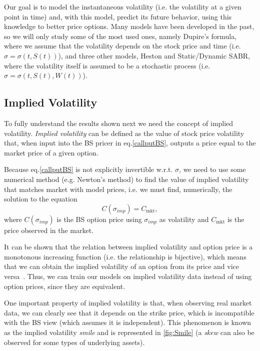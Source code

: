 Our goal is to model the instantaneous volatility (i.e. the volatility at a given point in time) and, with this model, predict its future behavior, using this knowledge to better price options.
Many models have been developed in the past, so we will only study some of the most used ones, namely Dupire's formula, where we assume that the volatility depends on the stock price and time (i.e. $\sigma=\sigma(t,S(t))$), and three other models, Heston and Static/Dynamic SABR, where the volatility itself is assumed to be a stochastic process (i.e. $\sigma=\sigma(t,S(t),W(t))$).

\subsection{Implied Volatility}
To fully understand the results shown next we need the concept of implied volatility.
\emph{Implied volatility} can be defined as the value of stock price volatility that, when input into the BS pricer in eq.\eqref{callputBS}, outputs a price equal to the market price of a given option.

Because eq.\eqref{callputBS} is not explicitly invertible w.r.t. $\sigma$, we need to use some numerical method (e.g. Newton's method) to find the value of implied volatility that matches market with model prices, i.e. we must find, numerically, the solution to the equation
\begin{equation}\label{impvolform}
C(\sigma_{imp})=C_{\mathrm{mkt}},
\end{equation}
\noindent where $C(\sigma_{imp})$ is the BS option price using $\sigma_{imp}$ as volatility and $C_{\mathrm{mkt}}$ is the price observed in the market.

It can be shown that the relation between implied volatility and option price is a monotonous increasing function (i.e. the relationship is bijective), which means that we can obtain the implied volatility of an option from its price and vice versa~\citep{Wilmott3}. Thus, we can train our models on implied volatility data instead of using option prices, since they are equivalent.

One important property of implied volatility is that, when observing real market data, we can clearly see that it depends on the strike price, which is incompatible with the BS view (which assumes it is independent).
This phenomenon is known as the implied volatility \emph{smile} and is represented in \autoref{fig:Smile} (a \emph{skew} can also be observed for some types of underlying assets).

